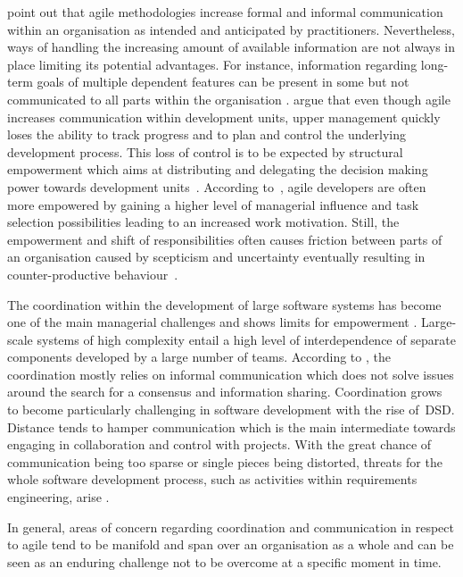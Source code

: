 \citet{pikkarainen2008impactagilecommunication} point out that agile methodologies increase formal and informal communication within an organisation as intended and anticipated by practitioners. Nevertheless, ways of handling the increasing amount of available information are not always in place limiting its potential advantages. For instance, information regarding long-term goals of multiple dependent features can be present in some but not communicated to all parts within the organisation \citep{pikkarainen2008impactagilecommunication}. \citet{cohn2003introducingagiletoanorganisation} argue that even though agile increases communication within development units, upper management quickly loses the ability to track progress and to plan and control the underlying development process. This loss of control is to be expected by structural empowerment 
which aims at distributing and delegating the decision making power towards development units~\citep{millslimitsempowerment}. According to~\citet{tessemindividualempoqerment}, agile developers are often more empowered by gaining a higher level of managerial influence and task selection possibilities leading to an increased work motivation.
Still, the empowerment and shift of responsibilities often causes friction between parts of an organisation caused by scepticism and uncertainty eventually resulting in counter-productive behaviour~\citep{millslimitsempowerment}. 

The coordination within the development of large software systems has become one of the main managerial challenges and shows limits for empowerment \citep{kraut1995coordinationinsd}. Large-scale systems of high complexity entail a high level of interdependence of separate components developed by a large number of teams. According to \citet{kraut1995coordinationinsd}, the coordination mostly relies on informal communication which does not solve issues around the search for a consensus and information sharing. Coordination grows to become particularly challenging in software development with the rise of~\ac{DSD}. Distance tends to hamper communication which is the main intermediate towards engaging in collaboration and control with projects. With the great chance of communication being too sparse or single pieces being distorted, threats for the whole software development process, such as activities within requirements engineering, arise \citep{prikladnicki2003globalsoftware}.       

In general, areas of concern regarding coordination and communication in respect to agile tend to be manifold and span over an organisation as a whole and can be seen as an enduring challenge not to be overcome at a specific moment in time.

